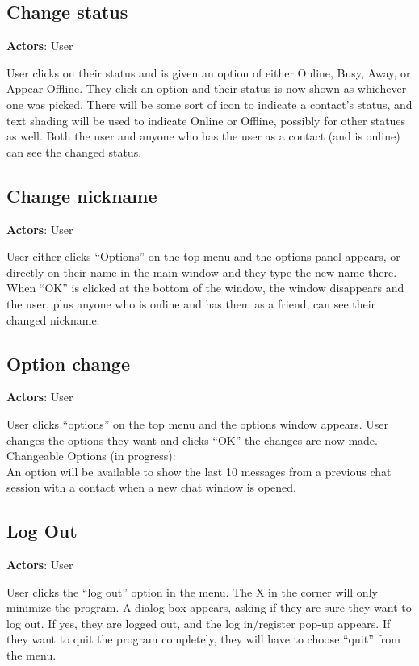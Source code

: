 \subsection{Change status}

{\bf Actors}: User

User clicks on their status and is given an option of either Online, Busy, Away, or Appear Offline. They click an option and their status is now shown as whichever one was picked. There will be some sort of icon to indicate a contact’s status, and text shading will be used to indicate Online or Offline, possibly for other statues as well. Both the user and anyone who has the user as a contact (and is online) can see the changed status.

\subsection{Change nickname}

{\bf Actors}: User

User either clicks ``Options'' on the top menu and the options panel appears, or directly on their name in the main window and they type the new name there. When ``OK'' is clicked at the bottom of the window, the window disappears and the user, plus anyone who is online and has them as a friend, can see their changed nickname.

\subsection{Option change}

{\bf Actors}: User

User clicks ``options'' on the top menu and the options window appears. User changes the options they want and clicks ``OK'' the changes are now made. \\
Changeable Options (in progress):\\
An option will be available to show the last 10 messages from a previous chat session with a contact when a new chat window is opened.

\subsection{Log Out}

{\bf Actors}: User

User clicks the ``log out'' option in the menu. The X in the corner will only minimize the program. A dialog box appears, asking if they are sure they want to log out. If yes, they are logged out, and the log in/register pop-up appears. If they want to quit the program completely, they will have to choose ``quit'' from the menu.

